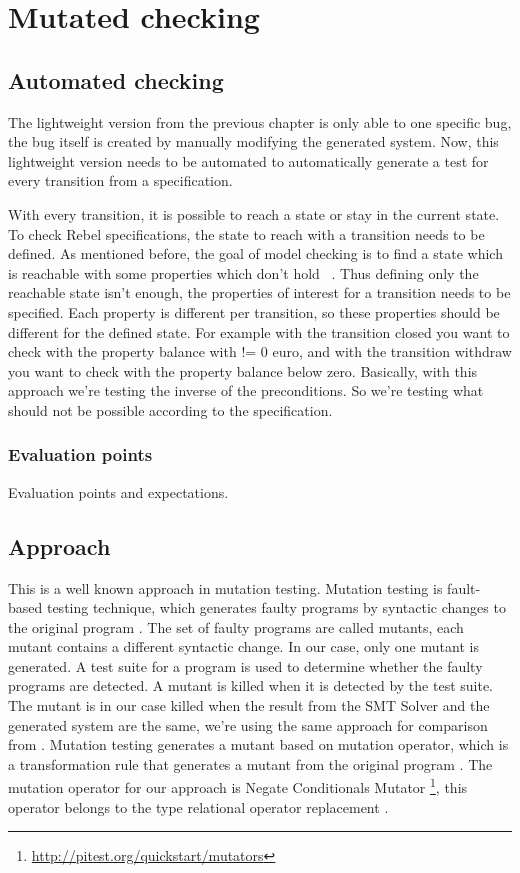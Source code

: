\chapter{Mutated checking}
\label{sec:ch4}


\section{Automated checking}

The lightweight version from the previous chapter is only able to one specific
bug, the bug itself is created by manually modifying the generated system. Now,
this lightweight version needs to be automated to automatically generate a test
for every transition from a specification.

With every transition, it is possible to reach a state or stay in the current
state. To check Rebel specifications, the state to reach with a transition needs
to be defined. As mentioned before, the goal of model checking is to find a
state which is reachable with some properties which don't hold
~\cite[p.5]{stoel_storm_vinju_bosman_2016}. Thus defining only the reachable
state isn't enough, the properties of interest for a transition needs to be
specified. Each property is different per transition, so these properties should
be different for the defined state. For example with the transition closed you
want to check with the property balance with != 0 euro, and with the transition
withdraw you want to check with the property balance below zero. Basically, with
this approach we're testing the inverse of the preconditions. So we're testing
what should not be possible according to the specification.

\subsection{Evaluation points}
Evaluation points and expectations.

\section{Approach}
This is a well known approach in mutation testing. Mutation testing is
fault-based testing technique, which generates faulty programs by syntactic
changes to the original program \cite[p.1]{jia2011analysis}. The set of faulty
programs are called mutants, each mutant contains a different syntactic change.
In our case, only one mutant is generated. A test suite for a program is used to
determine whether the faulty programs are detected. A mutant is killed when it
is detected by the test suite. The mutant is in our case killed when the result
from the SMT Solver and the generated system are the same, we're using the same
approach for comparison from . Mutation testing generates a mutant based on
mutation operator, which is a transformation rule that generates a mutant from
the original program \cite[p.3-4]{jia2011analysis}. The mutation operator for
our approach is Negate Conditionals Mutator
\footnote{\url{http://pitest.org/quickstart/mutators}}, this operator belongs to
the type relational operator replacement \cite[p.688]{king1991fortran}.

